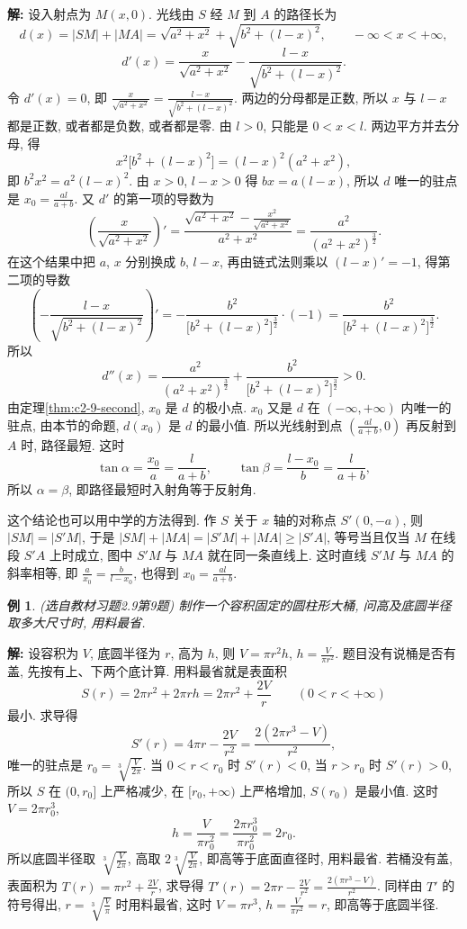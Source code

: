 \documentclass[UTF8,openany]{ctexbook}
\theoremstyle{chinesetextbook}
\newtheorem{example}{例}[section]
\newenvironment{cnsolution}{\par\indent\textbf{解:} \ignorespaces}{\par}
\begin{document}
\begin{cnsolution}
设入射点为 $M(x,0)$. 光线由 $S$ 经 $M$ 到 $A$ 的路径长为
\[
d(x)=|SM|+|MA|=\sqrt{a^2+x^2}+\sqrt{b^2+(l-x)^2},\qquad-\infty<x<+\infty,
\]
\[
d'(x)=\frac x{\sqrt{a^2+x^2}}-\frac{l-x}{\sqrt{b^2+(l-x)^2}}.
\]
令 $d'(x)=0$, 即 $\displaystyle\frac x{\sqrt{a^2+x^2}}=\frac{l-x}{\sqrt{b^2+(l-x)^2}}$. 两边的分母都是正数, 所以 $x$ 与 $l-x$ 都是正数, 或者都是负数, 或者都是零. 由 $l>0$, 只能是 $0<x<l$. 两边平方并去分母, 得
\[
x^2\bigl[b^2+(l-x)^2\bigr]=(l-x)^2(a^2+x^2),
\]
即 $b^2x^2=a^2(l-x)^2$. 由 $x>0$, $l-x>0$ 得 $bx=a(l-x)$, 所以 $d$ 唯一的驻点是 $\displaystyle x_0=\frac{al}{a+b}$. 又 $d'$ 的第一项的导数为
\[
\left(\frac x{\sqrt{a^2+x^2}}\right)'=\frac{\sqrt{a^2+x^2}-\frac{x^2}{\sqrt{a^2+x^2}}}{a^2+x^2}=\frac{a^2}{(a^2+x^2)^{\frac32}}.
\]
在这个结果中把 $a$, $x$ 分别换成 $b$, $l-x$, 再由链式法则乘以 $(l-x)'=-1$, 得第二项的导数
\[
\left(-\frac{l-x}{\sqrt{b^2+(l-x)^2}}\right)'=-\frac{b^2}{\bigl[b^2+(l-x)^2\bigr]^{\frac32}}\cdot(-1)=\frac{b^2}{\bigl[b^2+(l-x)^2\bigr]^{\frac32}}.
\]
所以
\[
d''(x)=\frac{a^2}{(a^2+x^2)^{\frac32}}+\frac{b^2}{\bigl[b^2+(l-x)^2\bigr]^{\frac32}}>0.
\]
由定理\ref{thm:c2-9-second}, $x_0$ 是 $d$ 的极小点. $x_0$ 又是 $d$ 在 $(-\infty,+\infty)$ 内唯一的驻点, 由本节的命题, $d(x_0)$ 是 $d$ 的最小值. 所以光线射到点 $\displaystyle\left(\frac{al}{a+b},0\right)$ 再反射到 $A$ 时, 路径最短. 这时
\[
\tan\alpha=\frac{x_0}a=\frac l{a+b},\qquad\tan\beta=\frac{l-x_0}b=\frac l{a+b},
\]
所以 $\alpha=\beta$, 即路径最短时入射角等于反射角.
\end{cnsolution}
这个结论也可以用中学的方法得到. 作 $S$ 关于 $x$ 轴的对称点 $S'(0,-a)$, 则 $|SM|=|S'M|$, 于是 $|SM|+|MA|=|S'M|+|MA|\ge|S'A|$, 等号当且仅当 $M$ 在线段 $S'A$ 上时成立, 图中 $S'M$ 与 $MA$ 就在同一条直线上. 这时直线 $S'M$ 与 $MA$ 的斜率相等, 即 $\displaystyle\frac a{x_0}=\frac b{l-x_0}$, 也得到 $\displaystyle x_0=\frac{al}{a+b}$.
\begin{example}\label{ex:c2-h9-9}
\textnormal{(选自教材习题2.9第9题)} 制作一个容积固定的圆柱形大桶, 问高及底圆半径取多大尺寸时, 用料最省.
\end{example}
\begin{cnsolution}
设容积为 $V$, 底圆半径为 $r$, 高为 $h$, 则 $V=\pi r^2h$, $\displaystyle h=\frac V{\pi r^2}$. 题目没有说桶是否有盖, 先按有上、下两个底计算. 用料最省就是表面积
\[
S(r)=2\pi r^2+2\pi rh=2\pi r^2+\frac{2V}r\qquad(0<r<+\infty)
\]
最小. 求导得
\[
S'(r)=4\pi r-\frac{2V}{r^2}=\frac{2(2\pi r^3-V)}{r^2},
\]
唯一的驻点是 $\displaystyle r_0=\sqrt[3]{\frac V{2\pi}}$. 当 $0<r<r_0$ 时 $S'(r)<0$, 当 $r>r_0$ 时 $S'(r)>0$, 所以 $S$ 在 $(0,r_0]$ 上严格减少, 在 $[r_0,+\infty)$ 上严格增加, $S(r_0)$ 是最小值. 这时 $V=2\pi r_0^3$,
\[
h=\frac V{\pi r_0^2}=\frac{2\pi r_0^3}{\pi r_0^2}=2r_0.
\]
所以底圆半径取 $\displaystyle\sqrt[3]{\frac V{2\pi}}$, 高取 $\displaystyle2\sqrt[3]{\frac V{2\pi}}$, 即高等于底面直径时, 用料最省. 若桶没有盖, 表面积为 $\displaystyle T(r)=\pi r^2+\frac{2V}r$, 求导得 $\displaystyle T'(r)=2\pi r-\frac{2V}{r^2}=\frac{2(\pi r^3-V)}{r^2}$. 同样由 $T'$ 的符号得出, $\displaystyle r=\sqrt[3]{\frac V\pi}$ 时用料最省, 这时 $V=\pi r^3$, $\displaystyle h=\frac V{\pi r^2}=r$, 即高等于底圆半径.
\end{cnsolution}
\end{document}
